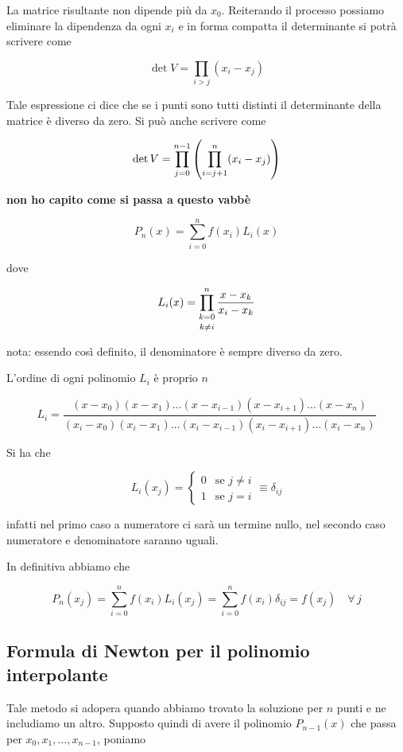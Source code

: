 La matrice risultante non dipende più da $x_0$. Reiterando il processo possiamo eliminare la dipendenza da ogni $x_i$ e in forma compatta il determinante si potrà scrivere come

$$\det V=\prod_{i>j} (x_i - x_j)$$

Tale espressione ci dice che se i punti sono tutti distinti il determinante della matrice è diverso da zero. Si può anche scrivere come

$$\det V=\prod_{j=0}^{n-1} \qty( \prod_{i=j+1}^{n} (x_i - x_j) )$$

\textbf{non ho capito come si passa a questo vabbè}

$$P_n(x)=\sum_{i=0}^{n} f(x_i) L_i(x)$$

dove

$$L_i(x)=\prod_{\begin{subarray}{c}
   k=0\\[0.1cm]
   k \neq i
\end{subarray}
}^{n} \frac{x - x_k}{x_i - x_k}
$$

nota: essendo così definito, il denominatore è sempre diverso da zero.

L'ordine di ogni polinomio $L_i$ è proprio $n$

$$L_i=\frac{
(x - x_0) (x - x_1) \ldots (x - x_{i-1}) (x - x_{i+1}) \ldots (x - x_n)
}{
(x_i - x_0) (x_i - x_1) \ldots (x_i - x_{i-1}) (x_i - x_{i+1}) \ldots (x_i - x_n)
}$$

Si ha che

$$L_i(x_j)=
\left\{
   \begin{array}{ll}
      0 & \text{se } j \neq i\\
      1 & \text{se } j = i
   \end{array}
\right.
\equiv \delta_{ij}$$

infatti nel primo caso a numeratore ci sarà un termine nullo, nel secondo caso numeratore e denominatore saranno uguali.

In definitiva abbiamo che

$$P_n(x_j)=\sum_{i=0}^{n} f(x_i) L_i(x_j)
=\sum_{i=0}^{n} f(x_i) \delta_{ij}
=f(x_j) \quad \forall \, j$$

\subsection{Formula di Newton per il polinomio interpolante}

Tale metodo si adopera quando abbiamo trovato la soluzione per $n$ punti e ne includiamo un altro. Supposto quindi di avere il polinomio $P_{n-1}(x)$ che passa per $x_0,x_1,\ldots,x_{n-1}$, poniamo

